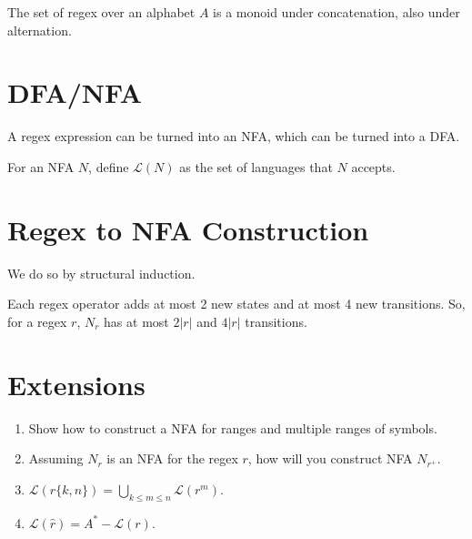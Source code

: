 \documentclass[a4paper]{scrartcl}
\theoremstyle{definition}
\newcommand{\card}[1]{\left\lvert #1 \right\rvert}
\begin{document}
The set of regex over an alphabet $A$ is a monoid under concatenation, also under alternation.

\section{DFA/NFA}
A regex expression can be turned into an NFA, which can be turned into a DFA.

For an NFA $N$, define $\mathcal{L}(N)$ as the set of languages that $N$ accepts.


\section{Regex to NFA Construction}
We do so by structural induction.

\begin{figure}[h]
	\centering
	\label{Alternation}
\end{figure}

Each regex operator adds at most 2 new states and at most 4 new transitions. So, for a regex $r$, $N_r$ has at most $2 \card{r}$ and $4 \card{r}$ transitions.

\section{Extensions}
\begin{enumerate}
	\item Show how to construct a NFA for ranges and multiple ranges of symbols.
	\item Assuming $N_r$ is an NFA for the regex $r$, how will you construct NFA $N_{r^+}$.
	\item $\mathcal{L}(r\{k, n\}) = \bigcup_{k \le m \le n} \mathcal{L}(r^m)$.
	\item $\mathcal{L}(\widehat{r}) = A^* - \mathcal{L}(r)$.
\end{enumerate}
\end{document}
